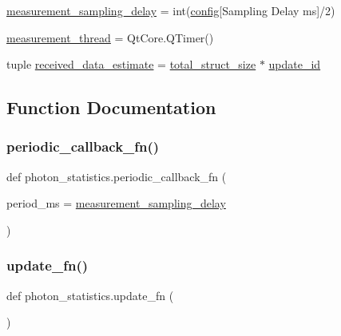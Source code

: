 \begin{DoxyCompactItemize}
\item 
\hyperlink{namespacephoton__statistics_ab809da8a53764aea064814bd4abdba42}{measurement\+\_\+sampling\+\_\+delay} = int(\hyperlink{namespacephoton__statistics_a4176c548148b1c86da6ddf320ab00e90}{config}\mbox{[}\textquotesingle{}Sampling Delay ms\textquotesingle{}\mbox{]}/2)
\item 
\hyperlink{namespacephoton__statistics_a826b8bcc70f5721cbb6036088fa1ed01}{measurement\+\_\+thread} = Qt\+Core.\+Q\+Timer()
\item 
tuple \hyperlink{namespacephoton__statistics_a17e0852f9ef02250d5e11c55b45dcbf6}{received\+\_\+data\+\_\+estimate} = \hyperlink{namespacephoton__statistics_aa8b4fc62029e126fa660593daaa282f8}{total\+\_\+struct\+\_\+size} $\ast$ \hyperlink{namespacephoton__statistics_aa0ea01ea8f5c4844ed6c10dbe51d0497}{update\+\_\+id}
\end{DoxyCompactItemize}


\subsection{Function Documentation}
\mbox{\label{namespacephoton__statistics_a3d8a4bcc1566dd71aab0925749e1416f}} 
\subsubsection{\texorpdfstring{periodic\+\_\+callback\+\_\+fn()}{periodic\_callback\_fn()}}
{\footnotesize\ttfamily def photon\+\_\+statistics.\+periodic\+\_\+callback\+\_\+fn (\begin{DoxyParamCaption}\item[{}]{period\+\_\+ms = {\ttfamily \hyperlink{namespacephoton__statistics_ab809da8a53764aea064814bd4abdba42}{measurement\+\_\+sampling\+\_\+delay}} }\end{DoxyParamCaption})}

\mbox{\label{namespacephoton__statistics_ad67c22ae3d8b73d690282b77915fa984}} 
\subsubsection{\texorpdfstring{update\+\_\+fn()}{update\_fn()}}
{\footnotesize\ttfamily def photon\+\_\+statistics.\+update\+\_\+fn (\begin{DoxyParamCaption}{ }\end{DoxyParamCaption})}



